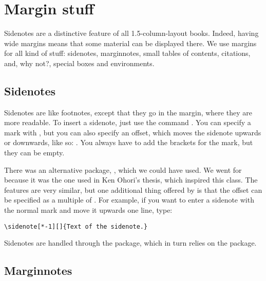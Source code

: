 \setchapterpreamble[u]{\margintoc}
\chapter{Margin stuff}

Sidenotes are a distinctive feature of all 1.5-column-layout books. 
Indeed, having wide margins means that some material can be displayed 
there. We use margins for all kind of stuff: sidenotes, marginnotes, 
small tables of contents, citations, and, why not?, special boxes and 
environments.

\section{Sidenotes}

Sidenotes are like footnotes, except that they go in the margin, where 
they are more readable. To insert a sidenote, just use the command 
. You can specify a 
mark with
, but you can also specify an offset, 
which moves the sidenote upwards or downwards, like so: 
. You always have to add the 
brackets for the mark, but they can be empty.

There was an alternative package, , which we could 
have used. We went for  because it was the one used in 
Ken Ohori's thesis, which inspired this class. The features are very 
similar, but one additional thing offered by  is that 
the offset can be specified as a multiple of . For 
example, if you want to enter a sidenote with the normal mark and move 
it upwards one line, type:

\begin{lstlisting}[style=kaolstplain]
\sidenote[*-1][]{Text of the sidenote.}
\end{lstlisting}

Sidenotes are handled through the  package, which in 
turn relies on the  package.

\section{Marginnotes}

